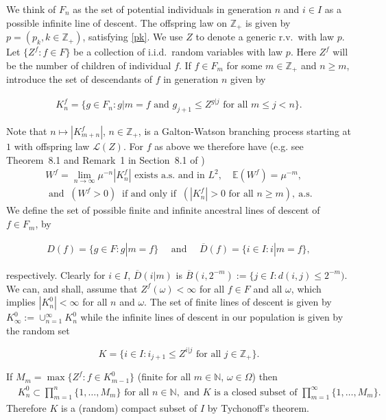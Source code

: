 \documentclass[12pt]{article}
\numberwithin{theorem}{section}
\theoremstyle{def}
\numberwithin{equation}{section}
\newcommand{\E}{\mathbb{E}}
\newcommand{\Z}{\mathbb{Z}}
\newcommand{\N}{\mathbb{N}}
\newcommand{\cL}{\mathcal{L}}
\newcommand{\SUBMIT}[1]{}
\newcommand{\ARXIV}[1]{#1}
\begin{document}
We think of $F_n$ as the set of potential individuals in generation $n$ and $i\in I$ as a possible infinite line of descent.  The offspring law on $\Z_+$ is given by $p=(p_k,k\in\Z_+)$, satisfying \eqref{pk}.
We use $Z$ to denote a generic r.v.\ with law $p$.  Let $\{Z^f:f\in F\}$ be a collection of i.i.d.\ random variables with law $p$. Here $Z^f$ will be the number of children of individual $f$.  If $f\in F_m$ for some $m\in\Z_+$ and $n\ge m$, introduce the set of descendants of $f$ in generation $n$ given by
\ARXIV{
\begin{align}\label{eq:def K^f_n}
K^f_n=\{g\in F_n:g|m=f\text{ and }g_{j+1}\le Z^{g|j}\text{ for all }m\le j<n\}.
\end{align}
}
\SUBMIT{
	\begin{align*}
		K^f_n=\{g\in F_n:g|m=f\text{ and }g_{j+1}\le Z^{g|j}\text{ for all }m\le j<n\}.
	\end{align*}
}
Note that $n\mapsto |K^f_{m+n}|$, $n\in\Z_+$, is a Galton-Watson branching process starting at $1$ with offspring law $\cL(Z)$. 
For $f$ as above we therefore have (e.g. see Theorem~8.1 and Remark~1 in Section~8.1 of \cite{Har})
\begin{multline}\label{Wfprop}W^f=\lim_{n\to\infty}\mu^{-n}|K_n^f|\text{ exists a.s.\ and in $L^2$}, \quad   \E(W^f)=\mu^{-m},\\
\text{ and } \  (W^f>0) \ \text{ if and only if }  \  (|K^f_n|>0 \text{ for all }n\ge m), \  \text{a.s.}
\end{multline}
We define the set of possible finite and infinite ancestral lines of descent of $f\in F_m$, by
\ARXIV{
\begin{align}\label{eq:def D(f)}
D(f)=\{g\in F:g|m=f\}\quad \text{ and } \quad  \overline D(f)=\{i\in I:i|m=f\},
\end{align}
}
\SUBMIT{
	\begin{align*}
		D(f)=\{g\in F:g|m=f\}\quad \text{ and } \quad  \overline D(f)=\{i\in I:i|m=f\},
	\end{align*}
}
respectively.
Clearly for $i\in I$, $\overline D(i|m)$ is $\overline B(i,2^{-m}):=\{j\in I:d(i,j)\le 2^{-m})$.  
We can, and shall, assume that $Z^f(\omega)<\infty$ for all $f\in F$ and all $\omega$, which implies $|K^0_n|<\infty$ for all $n$ and $\omega$.
The set of finite lines of descent is given by $K_\infty^0:=\cup_{n=1}^\infty K^0_n$ while the infinite lines of descent in our population is given by the random set
\ARXIV{
\begin{equation}\label{Kdef}
K=\{i\in I: i_{j+1}\le Z^{i|j}\text{ for all }j\in\Z_+\}.
\end{equation}
}
\SUBMIT{
\begin{equation*}
		K=\{i\in I: i_{j+1}\le Z^{i|j}\text{ for all }j\in\Z_+\}.
\end{equation*}
}
If $M_m=\max\{Z^f:f\in K^0_{m-1}\}$ (finite for all $m\in\N$, $\omega\in \Omega$) then 
\begin{align}\label{Kbounds}
&K_n^0\subset\prod_{m=1}^n\{1,\dots,M_m\}\text{ for all }n\in\N,\text{ and }K
\text{ is a closed subset of }\prod_{m=1}^\infty\{1,\dots,M_m\}.
 \end{align}
Therefore $K$ is a (random) compact subset of $I$ by Tychonoff's theorem.
\end{document}
